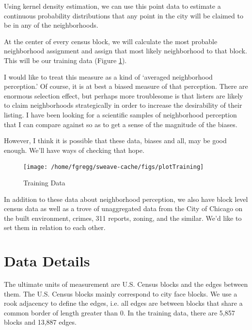 \documentclass[12pt,letter]{article}\usepackage[]{graphicx}\usepackage[]{color}
\newenvironment{knitrout}{}{} %
\begin{document}
Using kernel density estimation, we can use this point data to
estimate a continuous probability distributions that any point in the
city will be claimed to be in any of the neighborhoods. 

At the center of every census block, we will calculate the most
probable neighborhood assignment and assign that most likely
neighborhood to that block. This will be our training data (Figure
\ref{fig:training}).

I would like to treat this measure as a kind of `averaged
neighborhood perception.' Of course, it is at best a biased measure of
that perception. There are enormous selection effect, but perhaps more
troublesome is that listers are likely to claim neighborhoods
strategically in order to increase the desirability of their
listing. I have been looking for a scientific samples of neighborhood
perception that I can compare against so as to get a sense of the
magnitude of the biases. 

However, I think it is possible that these data, biases and all, may
be good enough. We'll have ways of checking that hope.


\begin{figure}
\begin{knitrout}
\color{fgcolor}

{\centering \texttt{[image: /home/fgregg/sweave-cache/figs/plotTraining]} 

}



\end{knitrout}

\caption{Training Data}
\label{fig:training}
\end{figure}

In addition to these data about neighborhood perception, we also have
block level census data as well as a trove of unaggregated data from
the City of Chicago on the built environment, crimes, 311 reports,
zoning, and the similar. We'd like to set them in relation to each
other.

\section*{Data Details}
The ultimate units of measurement are U.S. Census blocks and the edges
between them. The U.S. Census blocks mainly correspond to city face blocks.
We use a rook adjacency to define the edges, i.e. all edges are between blocks
that share a common border of length greater than 0. In the training data,
there are 5,857 blocks and
  13,887 edges.
\end{document}
